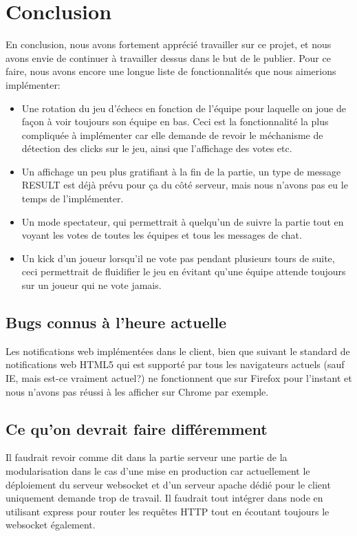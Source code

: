 \documentclass{article}
\begin{document}
\section{Conclusion}
En conclusion, nous avons fortement apprécié travailler sur ce projet, et nous avons envie de continuer à travailler dessus dans le but de le publier. Pour ce faire, nous avons encore une longue liste de fonctionnalités que nous aimerions implémenter:
\begin{itemize}
\item Une rotation du jeu d'échecs en fonction de l'équipe pour laquelle on joue de façon à voir toujours son équipe en bas. Ceci est la fonctionnalité la plus compliquée à implémenter car elle demande de revoir le méchanisme de détection des clicks sur le jeu, ainsi que l'affichage des votes etc.
\item Un affichage un peu plus gratifiant à la fin de la partie, un type de message RESULT est déjà prévu pour ça du côté serveur, mais nous n'avons pas eu le temps de l'implémenter.
\item Un mode spectateur, qui permettrait à quelqu'un de suivre la partie tout en voyant les votes de toutes les équipes et tous les messages de chat.
\item Un kick d'un joueur lorsqu'il ne vote pas pendant plusieurs tours de suite, ceci permettrait de fluidifier le jeu en évitant qu'une équipe attende toujours sur un joueur qui ne vote jamais.
\end{itemize}
\subsection{Bugs connus à l'heure actuelle}
Les notifications web implémentées dans le client, bien que suivant le standard de notifications web HTML5 qui est supporté par tous les navigateurs actuels (sauf IE, mais est-ce vraiment actuel?) ne fonctionnent que sur Firefox pour l'instant et nous n'avons pas réussi à les afficher sur Chrome par exemple.
\subsection{Ce qu'on devrait faire différemment}
Il faudrait revoir comme dit dans la partie serveur une partie de la modularisation dans le cas d'une mise en production car actuellement le déploiement du serveur websocket et d'un serveur apache dédié pour le client uniquement demande trop de travail. Il faudrait tout intégrer dans node en utilisant express pour router les requêtes HTTP tout en écoutant toujours le websocket également.
\end{document}
